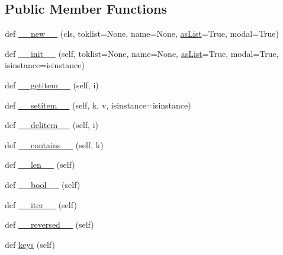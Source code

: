 \subsection*{Public Member Functions}
\begin{DoxyCompactItemize}
\item 
def \hyperlink{classpip_1_1__vendor_1_1pyparsing_1_1ParseResults_a2680e2bebd8b9225e3c4253e38aa1af5}{\+\_\+\+\_\+new\+\_\+\+\_\+} (cls, toklist=None, name=None, \hyperlink{classpip_1_1__vendor_1_1pyparsing_1_1ParseResults_a0ab042edd2e7a65684f0c89d7b523f67}{as\+List}=True, modal=True)
\item 
def \hyperlink{classpip_1_1__vendor_1_1pyparsing_1_1ParseResults_ad2d7ed712bb90873d10b65c57021da89}{\+\_\+\+\_\+init\+\_\+\+\_\+} (self, toklist=None, name=None, \hyperlink{classpip_1_1__vendor_1_1pyparsing_1_1ParseResults_a0ab042edd2e7a65684f0c89d7b523f67}{as\+List}=True, modal=True, isinstance=isinstance)
\item 
def \hyperlink{classpip_1_1__vendor_1_1pyparsing_1_1ParseResults_a756664f68199bb437c745989aad9321d}{\+\_\+\+\_\+getitem\+\_\+\+\_\+} (self, i)
\item 
def \hyperlink{classpip_1_1__vendor_1_1pyparsing_1_1ParseResults_ab188dc340b34d61e245c9cd15686bb46}{\+\_\+\+\_\+setitem\+\_\+\+\_\+} (self, k, v, isinstance=isinstance)
\item 
def \hyperlink{classpip_1_1__vendor_1_1pyparsing_1_1ParseResults_a870d2004630d985f59d745c811429430}{\+\_\+\+\_\+delitem\+\_\+\+\_\+} (self, i)
\item 
def \hyperlink{classpip_1_1__vendor_1_1pyparsing_1_1ParseResults_a7d4974f77ebad3e378c708f0907c79fc}{\+\_\+\+\_\+contains\+\_\+\+\_\+} (self, k)
\item 
def \hyperlink{classpip_1_1__vendor_1_1pyparsing_1_1ParseResults_a707e10743f749daa785f80403cbca1f7}{\+\_\+\+\_\+len\+\_\+\+\_\+} (self)
\item 
def \hyperlink{classpip_1_1__vendor_1_1pyparsing_1_1ParseResults_a62f54edecf744227c5d8e12258230b25}{\+\_\+\+\_\+bool\+\_\+\+\_\+} (self)
\item 
def \hyperlink{classpip_1_1__vendor_1_1pyparsing_1_1ParseResults_a70d31dbbcda0dfde4faa75eb1012c8d4}{\+\_\+\+\_\+iter\+\_\+\+\_\+} (self)
\item 
def \hyperlink{classpip_1_1__vendor_1_1pyparsing_1_1ParseResults_a2cee2d2af47188214ea3d9fc647809ad}{\+\_\+\+\_\+reversed\+\_\+\+\_\+} (self)
\item 
def \hyperlink{classpip_1_1__vendor_1_1pyparsing_1_1ParseResults_ad1d51ac1224e1ef56c735c9a68fc2e9a}{keys} (self)

\end{DoxyCompactItemize}
